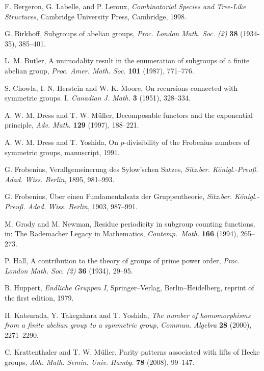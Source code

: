 \documentclass[12pt,reqno]{amsart}
\numberwithin{equation}{section}
\theoremstyle{remark}
\begin{document}
\begin{thebibliography}{99}

 F. Bergeron, G. Labelle, and P. Leroux,
\textit{Combinatorial Species and Tree-Like Structures}, Cambridge
University Press,
Cambridge, 1998.

G. Birkhoff, Subgroups of abelian groups, {\em Proc. London
Math. Soc. (2)} {\bf 38} (1934-35), 385--401.

L. M. Butler, A unimodality result in the enumeration of subgroups of
a finite abelian group, {\em Proc. Amer. Math. Soc.} {\bf 101} (1987),
771--776.

S. Chowla, I. N. Herstein and W. K. Moore, On recursions connected
  with symmetric groups. I, {\em Canadian J. Math.} {\bf 3} (1951), 328--334.

 A. W. M. Dress and T. W. M\"uller, Decomposable functors and
  the exponential principle, \textit{Adv. Math.} \textbf{129}
  (1997), 188--221. 

 A. W. M. Dress and T. Yoshida, On
$p$-divisibility of the Frobenius numbers of symmetric groups,
manuscript, 1991.

 G. Frobenius, Verallgemeinerung des Sylow'schen
  Satzes, \textit{Sitz.ber. K\"onigl.-Preu{\ss}. Adad. Wiss. Berlin},
  1895, 981--993. 

 G. Frobenius, \"Uber einen Fundamentalsatz der
  Gruppentheorie, \textit{Sitz.ber. K\"onigl.-Preu{\ss}. Adad. Wiss. Berlin},
  1903, 987--991.

 M. Grady and M. Newman, Residue periodicity in
subgroup counting functions, in: The Rademacher Legacy in
Mathematics, {\em Contemp.\ Math.} {\bf 166} (1994), 265--273.

P. Hall, A contribution to the theory of groups of prime power order,
{\em Proc. London Math. Soc. (2)} {\bf 36} (1934), 29--95.

 B. Huppert, \textit{Endliche Gruppen I},
  Springer--Verlag, Berlin--Heidelberg, reprint of the first edition,
  1979. 

H. Katsurada, Y. Takegahara and T. Yoshida,
{\em The number of homomorphisms from
a finite abelian group to a symmetric
group}, {\em Commun. Algebra} {\bf 28} (2000), 2271--2290.

 C. Krattenthaler and T. W. M\"uller, Parity patterns
  associated with lifts of Hecke groups,
  \textit{Abh. Math. Semin. Univ. Hambg.} \textbf{78} (2008),
  99--147. 


\end{thebibliography}
\end{document}
